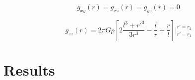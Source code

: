 \documentclass[paper,twocolumn,twoside]{geophysics}
\begin{document}
\begin{equation}
    g_{xy}(r) = g_{xz}(r) = g_{yz}(r) = 0
\end{equation}

\begin{equation}
    g_{zz}(r) = 2\pi G \rho \left[ 2\dfrac{l^3 + {r'}^3}{3r^3} - \dfrac{l}{r} +
    \dfrac{r}{l} \right] \Biggr \rvert_{r'=r_1}^{r'=r_2}
\end{equation}



\section{Results}


\end{document}

